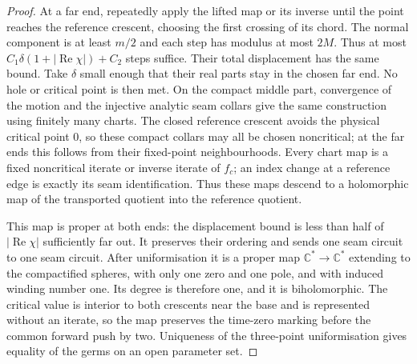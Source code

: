 \documentclass[11pt]{article}
\newcommand{\C}{\mathbb C}
\newcommand{\re}{\operatorname{Re}}
\begin{document}
\begin{proof}
At a far end, repeatedly apply the lifted map or its inverse until
the point reaches the reference crescent, choosing the first crossing
of its chord. The normal component is at least $m/2$ and each step
has modulus at most $2M$. Thus at most
$C_1\delta(1+|\re\chi|)+C_2$ steps suffice. Their total displacement
has the same bound. Take $\delta$ small enough that their real parts
stay in the chosen far end. No hole or critical point is then met.
On the compact middle part, convergence of the motion and the
injective analytic seam collars give the same construction using
finitely many charts. The closed reference crescent avoids the physical
critical point $0$, so these compact collars may all be chosen
noncritical; at the far ends this follows from their fixed-point
neighbourhoods. Every chart map is a fixed noncritical iterate
or inverse iterate of $f_c$; an index change at a reference edge is
exactly its seam identification. Thus these maps descend to a
holomorphic map of the transported quotient into the reference
quotient.

This map is proper at both ends: the displacement bound is less than
half of $|\re\chi|$ sufficiently far out. It preserves their ordering
and sends one seam circuit to one seam circuit. After uniformisation
it is a proper map $\C^*\to\C^*$ extending to the compactified spheres,
with only one zero and one pole, and with induced winding number one.
Its degree is therefore one, and it is biholomorphic. The critical
value is interior to both crescents near the base and is represented
without an iterate, so the map preserves the time-zero marking before
the common forward push by two. Uniqueness of the three-point
uniformisation gives equality of the germs on an open parameter set.
\end{proof}
\end{document}

